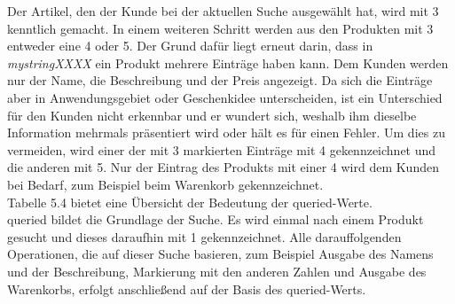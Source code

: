 Der Artikel, den der Kunde bei der aktuellen Suche ausgewählt hat, wird mit 3 kenntlich gemacht. In einem weiteren Schritt werden aus den Produkten mit 3 entweder eine 4 oder 5. Der Grund dafür liegt erneut darin, dass in \textit{mystringXXXX} ein Produkt mehrere Einträge haben kann. Dem Kunden werden nur der Name, die Beschreibung und der Preis angezeigt. Da sich die Einträge aber in Anwendungsgebiet oder Geschenkidee unterscheiden, ist ein Unterschied für den Kunden nicht erkennbar und er wundert sich, weshalb ihm dieselbe Information mehrmals präsentiert wird oder hält es für einen Fehler. Um dies zu vermeiden, wird einer der mit 3 markierten Einträge mit 4 gekennzeichnet und die anderen mit 5. Nur der Eintrag des Produkts mit einer 4 wird dem Kunden bei Bedarf, zum Beispiel beim Warenkorb gekennzeichnet.\\
Tabelle 5.4 bietet eine Übersicht der Bedeutung der queried-Werte.\\
queried bildet die Grundlage der Suche. Es wird einmal nach einem Produkt gesucht und dieses daraufhin mit 1 gekennzeichnet. Alle darauffolgenden Operationen, die auf dieser Suche basieren, zum Beispiel Ausgabe des Namens und der Beschreibung, Markierung mit den anderen Zahlen und Ausgabe des Warenkorbs, erfolgt anschließend auf der Basis des queried-Werts.\\




